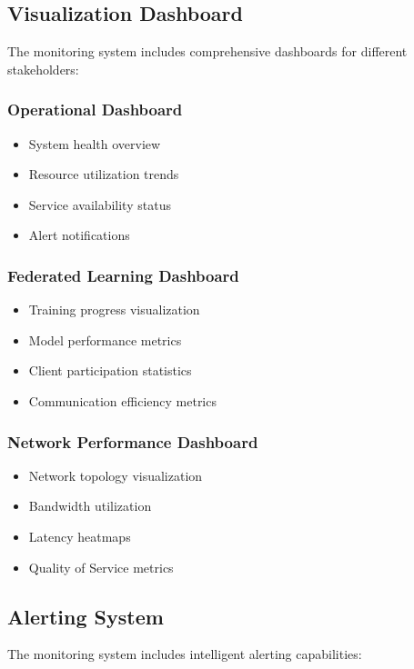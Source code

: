 \subsection{Visualization Dashboard}

The monitoring system includes comprehensive dashboards for different stakeholders:

\subsubsection{Operational Dashboard}
\begin{itemize}
    \item System health overview
    \item Resource utilization trends
    \item Service availability status
    \item Alert notifications
\end{itemize}

\subsubsection{Federated Learning Dashboard}
\begin{itemize}
    \item Training progress visualization
    \item Model performance metrics
    \item Client participation statistics
    \item Communication efficiency metrics
\end{itemize}

\subsubsection{Network Performance Dashboard}
\begin{itemize}
    \item Network topology visualization
    \item Bandwidth utilization
    \item Latency heatmaps
    \item Quality of Service metrics
\end{itemize}

\subsection{Alerting System}

The monitoring system includes intelligent alerting capabilities:

